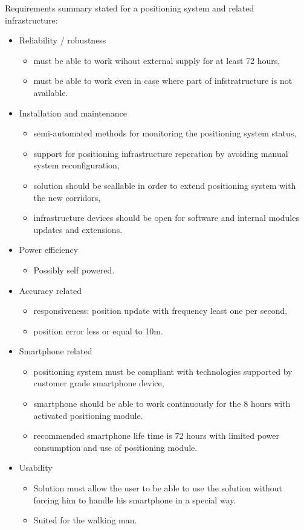 \documentclass[../main.tex]{subfiles}
\begin{document}
Requirements summary stated for a positioning system and related infrastructure:
\begin{itemize}
	\item Reliability / robustness
	\begin{itemize}
		\item must be able to work wihout external supply for at least 72 hours,
		\item must be able to work even in case where part of infstratructure is not available.
	\end{itemize}
	\item Installation and maintenance
	\begin{itemize}
		\item semi-automated methods for monitoring the positioning system status,
		\item support for positioning infrastructure reperation by avoiding manual system reconfiguration,
		\item solution should be scallable in order to extend positioning system with the new corridors,
		\item infrastructure devices should be open for software and internal modules updates and extensions.
	\end{itemize}
	\item Power efficiency
	\begin{itemize}
		\item Possibly self powered.
	\end{itemize}
	\item Accuracy related
	\begin{itemize}
		\item responsiveness: position update with frequency least one per second,
		\item position error less or equal to 10m.
	\end{itemize}
	\item Smartphone related
	\begin{itemize}
		\item positioning system must be compliant with technologies supported by customer grade smartphone device,
		\item smartphone should be able to work continuously for the 8 hours with activated positioning module.
		\item recommended smartphone life time is 72 hours with limited power consumption and use of positioning module.
	\end{itemize}
	\item Usability
	\begin{itemize}
		\item Solution must allow the user to be able to use the solution without forcing him to handle his smartphone in a special way.
		\item Suited for the walking man.
	\end{itemize}
\end{itemize}
\end{document}
